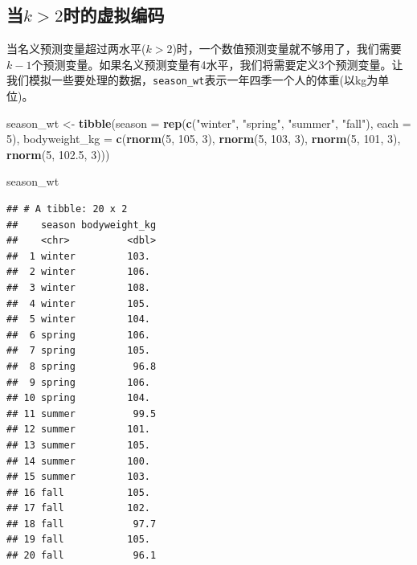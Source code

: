 \documentclass[
]{book}
\newenvironment{Shaded}{\begin{snugshade}}{\end{snugshade}}
\newcommand{\AttributeTok}[1]{\textcolor[rgb]{0.13,0.29,0.53}{#1}}
\newcommand{\DecValTok}[1]{\textcolor[rgb]{0.00,0.00,0.81}{#1}}
\newcommand{\FloatTok}[1]{\textcolor[rgb]{0.00,0.00,0.81}{#1}}
\newcommand{\FunctionTok}[1]{\textcolor[rgb]{0.13,0.29,0.53}{\textbf{#1}}}
\newcommand{\NormalTok}[1]{#1}
\newcommand{\OtherTok}[1]{\textcolor[rgb]{0.56,0.35,0.01}{#1}}
\newcommand{\StringTok}[1]{\textcolor[rgb]{0.31,0.60,0.02}{#1}}
\begin{document}
\hypertarget{ux5f53k-2ux65f6ux7684ux865aux62dfux7f16ux7801}{%
\subsection{\texorpdfstring{当\(k > 2\)时的虚拟编码}{当k \textgreater{} 2时的虚拟编码}}\label{ux5f53k-2ux65f6ux7684ux865aux62dfux7f16ux7801}}

当名义预测变量超过两水平(\(k > 2\))时，一个数值预测变量就不够用了，我们需要\(k-1\)个预测变量。如果名义预测变量有4水平，我们将需要定义3个预测变量。让我们模拟一些要处理的数据，\texttt{season\_wt}表示一年四季一个人的体重(以kg为单位)。

\begin{Shaded}
\begin{Highlighting}[]
\NormalTok{season\_wt }\OtherTok{\textless{}{-}} \FunctionTok{tibble}\NormalTok{(}\AttributeTok{season =} \FunctionTok{rep}\NormalTok{(}\FunctionTok{c}\NormalTok{(}\StringTok{"winter"}\NormalTok{, }\StringTok{"spring"}\NormalTok{, }\StringTok{"summer"}\NormalTok{, }\StringTok{"fall"}\NormalTok{),}
                                 \AttributeTok{each =} \DecValTok{5}\NormalTok{),}
                    \AttributeTok{bodyweight\_kg =} \FunctionTok{c}\NormalTok{(}\FunctionTok{rnorm}\NormalTok{(}\DecValTok{5}\NormalTok{, }\DecValTok{105}\NormalTok{, }\DecValTok{3}\NormalTok{),}
                                      \FunctionTok{rnorm}\NormalTok{(}\DecValTok{5}\NormalTok{, }\DecValTok{103}\NormalTok{, }\DecValTok{3}\NormalTok{),}
                                      \FunctionTok{rnorm}\NormalTok{(}\DecValTok{5}\NormalTok{, }\DecValTok{101}\NormalTok{, }\DecValTok{3}\NormalTok{),}
                                      \FunctionTok{rnorm}\NormalTok{(}\DecValTok{5}\NormalTok{, }\FloatTok{102.5}\NormalTok{, }\DecValTok{3}\NormalTok{)))}

\NormalTok{season\_wt}
\end{Highlighting}
\end{Shaded}

\begin{verbatim}
## # A tibble: 20 x 2
##    season bodyweight_kg
##    <chr>          <dbl>
##  1 winter         103. 
##  2 winter         106. 
##  3 winter         108. 
##  4 winter         105. 
##  5 winter         104. 
##  6 spring         106. 
##  7 spring         105. 
##  8 spring          96.8
##  9 spring         106. 
## 10 spring         104. 
## 11 summer          99.5
## 12 summer         101. 
## 13 summer         105. 
## 14 summer         100. 
## 15 summer         103. 
## 16 fall           105. 
## 17 fall           102. 
## 18 fall            97.7
## 19 fall           105. 
## 20 fall            96.1
\end{verbatim}
\end{document}
